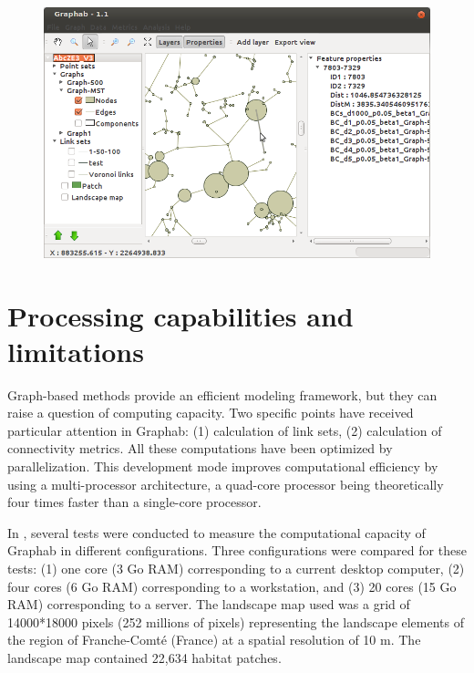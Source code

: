 \documentclass{article}
\begin{document}
\begin{figure}[H]
	\includegraphics[scale=0.5]{img/manual-en_img18.png}
\end{figure}


\section{Processing capabilities and limitations}
\label{limit}
Graph-based methods provide an efficient modeling framework, but they can raise a question of computing capacity. Two specific points have received particular attention in Graphab: (1) calculation of link sets, (2) calculation of connectivity metrics. All these computations have been optimized by parallelization. This development mode improves computational efficiency by using a multi-processor architecture, a
quad-core processor being theoretically four times faster than a single-core processor.

In \cite{2012_graphab_EMS}, several tests were conducted to measure the computational capacity of Graphab in different configurations. Three configurations were compared for these
tests: (1) one core (3 Go RAM) corresponding to a current desktop computer, (2) four cores (6 Go RAM) corresponding to a workstation, and (3) 20 cores (15 Go RAM) corresponding to a server. The landscape map used was a grid of 14000*18000 pixels (252 millions of pixels) representing the landscape elements of the region of Franche-Comté (France) at a spatial resolution of 10 m. The landscape map contained 22,634 habitat patches. 
\end{document}
